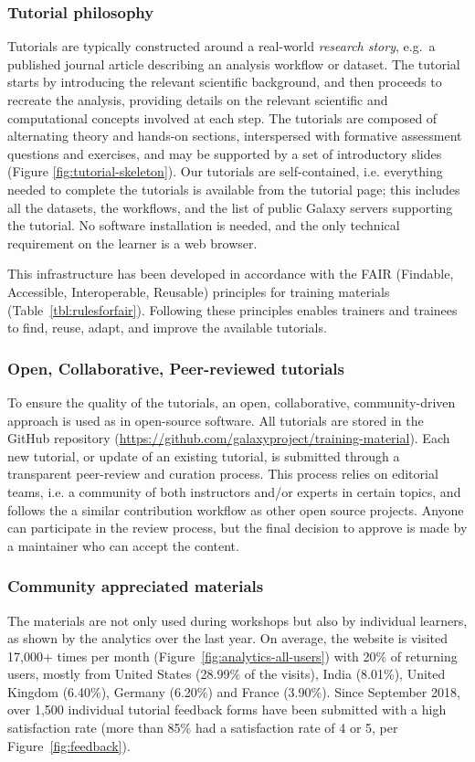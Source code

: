 \documentclass[10pt,letterpaper]{article}
\begin{document}
\subsubsection*{Tutorial philosophy}

Tutorials are typically constructed around a real-world \emph{research story}, e.g.\ a published journal article describing an analysis workflow or dataset. 
The tutorial starts by introducing the relevant scientific background, and then proceeds to recreate the analysis, providing details on the relevant scientific and computational concepts involved at each step. The tutorials are composed of alternating theory and hands-on sections, interspersed with formative assessment questions and exercises, and may be supported by a set of introductory slides (Figure \ref{fig:tutorial-skeleton}). Our tutorials are self-contained, i.e. everything needed to complete the tutorials is available from the tutorial page; this includes all the datasets, the workflows, and the list of public Galaxy servers supporting the tutorial. No software installation is needed, and the only technical requirement on the learner is a web browser.


This infrastructure has been developed in accordance with the FAIR (Findable, Accessible, Interoperable, Reusable) principles for training materials \cite{Garcia2020} (Table~\ref{tbl:rulesforfair}). Following these principles enables trainers and trainees to find, reuse, adapt, and improve the available tutorials. 


\subsubsection*{Open, Collaborative, Peer-reviewed tutorials}
To ensure the quality of the tutorials, an open, collaborative, community-driven approach is used as in open-source software. All tutorials are stored in the GitHub repository (\url{https://github.com/galaxyproject/training-material}). Each new tutorial, or update of an existing tutorial, is submitted through a transparent peer-review and curation process. This process relies on editorial teams, i.e. a community of both instructors and/or experts in certain topics, and follows the a similar contribution workflow as other open source projects. Anyone can participate in the review process, but the final decision to approve is made by a maintainer who can accept the content.

\subsubsection*{Community appreciated materials} The materials are not only used during workshops but also by individual learners, as shown by the analytics over the last year. On average, the website is visited 17,000+ times per month (Figure~\ref{fig:analytics-all-users}) with 20\% of returning users, mostly from United States (28.99\% of the visits), India (8.01\%), United Kingdom (6.40\%), Germany (6.20\%) and France (3.90\%).  Since September 2018, over 1,500 individual tutorial feedback forms have been submitted with a high satisfaction rate (more than 85\% had a satisfaction rate of 4 or 5, per Figure~\ref{fig:feedback}).
\end{document}
